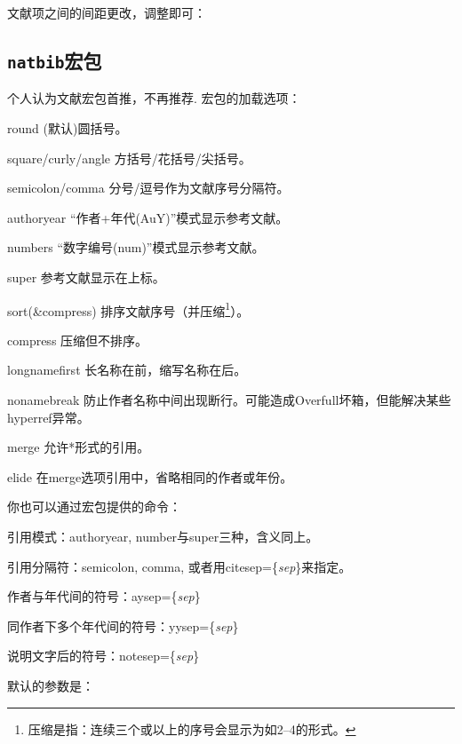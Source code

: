 文献项之间的间距更改，调整即可：
\begin{latex}
\setlength{\bibsep}{1ex}
\end{latex}

\subsection{\texttt{natbib}宏包}
个人认为文献宏包首推，不再推荐. 宏包的加载选项：
\begin{para}
\item[round] (默认)圆括号。
\item[square/curly/angle] 方括号/花括号/尖括号。
\item[semicolon/comma] 分号/逗号作为文献序号分隔符。
\item[authoryear] “作者+年代(AuY)”模式显示参考文献。
\item[numbers] “数字编号(num)”模式显示参考文献。
\item[super] 参考文献显示在上标。
\item[sort(\&compress)] 排序文献序号（并压缩\footnote{压缩是指：连续三个或以上的序号会显示为如2--4的形式。}）。
\item[compress] 压缩但不排序。
\item[longnamefirst] 长名称在前，缩写名称在后。
\item[nonamebreak] 防止作者名称中间出现断行。可能造成Overfull坏箱，但能解决某些hyperref异常。
\item[merge] 允许*形式的引用。
\item[elide] 在merge选项引用中，省略相同的作者或年份。
\end{para}

你也可以通过宏包提供的命令：
\begin{feae}
\item 引用模式：authoryear, number与super三种，含义同上。
\item 引用分隔符：semicolon, comma, 或者用citesep=\{\textit{sep}\}来指定。
\item 作者与年代间的符号：aysep=\{\textit{sep}\}
\item 同作者下多个年代间的符号：yysep=\{\textit{sep}\}
\item 说明文字后的符号：notesep=\{\textit{sep}\}
\end{feae}

默认的参数是：
\begin{latex}
\end{latex}

